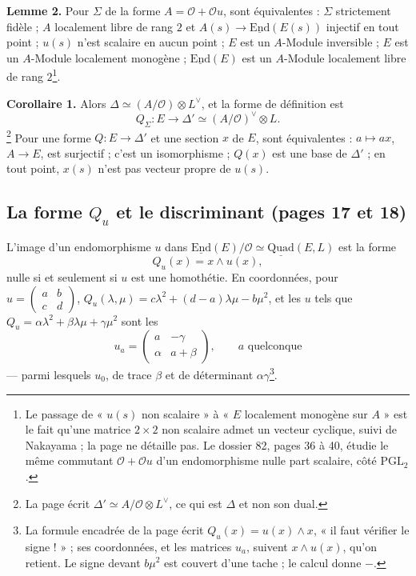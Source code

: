 \documentclass[11pt,a4paper]{article}
\begin{document}
\textbf{Lemme 2.} Pour $\Sigma$ de la forme $A = \mathcal{O} + \mathcal{O}u$, sont
équivalentes : $\Sigma$ strictement fidèle ; $A$ localement libre de rang $2$ et
$A(s) \to \underline{\mathrm{End}}(E(s))$ injectif en tout point ; $u(s)$ n'est
scalaire en aucun point ; $E$ est un $A$-Module inversible ; $E$ est un $A$-Module
localement monogène ; $\underline{\mathrm{End}}(E)$ est un $A$-Module localement
libre de rang $2$\footnote{Le passage de « $u(s)$ non scalaire » à « $E$ localement
monogène sur $A$ » est le fait qu'une matrice $2 \times 2$ non scalaire admet un
vecteur cyclique, suivi de Nakayama ; la page ne détaille pas. Le dossier 82,
pages 36 à 40, étudie le même commutant $\mathcal{O} + \mathcal{O}u$ d'un
endomorphisme nulle part scalaire, côté $\mathrm{PGL}_2$.}.

\textbf{Corollaire 1.} Alors $\Delta \simeq (A/\mathcal{O}) \otimes L^{\vee}$, et la forme
de définition est
\[
  Q_\Sigma : E \longrightarrow \Delta' \simeq (A/\mathcal{O})^{\vee} \otimes L.
\]\footnote{La
  page écrit $\Delta' \simeq A/\mathcal{O} \otimes L^{\vee}$, ce qui est $\Delta$ et non
  son dual.}
Pour une forme $Q : E \to \Delta'$ et une section $x$ de $E$, sont équivalentes :
$a \mapsto ax$, $A \to E$, est surjectif ; c'est un isomorphisme ; $Q(x)$ est une
base de $\Delta'$ ; en tout point, $x(s)$ n'est pas vecteur propre de $u(s)$.

\subsection*{La forme $Q_u$ et le discriminant (pages 17 et 18)}

L'image d'un endomorphisme $u$ dans $\underline{\mathrm{End}}(E)/\mathcal{O} \simeq
\underline{\mathrm{Quad}}(E, L)$ est la forme
\[
  Q_u(x) = x \wedge u(x),
\]
nulle si et seulement si $u$ est une homothétie. En coordonnées, pour
$u = \begin{pmatrix} a & b \\ c & d \end{pmatrix}$,
$Q_u(\lambda, \mu) = c\lambda^{2} + (d - a)\lambda\mu - b\mu^{2}$, et les $u$ tels que
$Q_u = \alpha\lambda^{2} + \beta\lambda\mu + \gamma\mu^{2}$ sont les
\[
  u_a = \begin{pmatrix} a & -\gamma \\ \alpha & a + \beta \end{pmatrix}, \qquad a \text{ quelconque}
\]
--- parmi lesquels $u_0$, de trace $\beta$ et de déterminant $\alpha\gamma$\footnote{La
formule encadrée de la page écrit $Q_u(x) = u(x) \wedge x$, « il faut vérifier le
signe ! » ; ses coordonnées, et les matrices $u_a$, suivent $x \wedge u(x)$, qu'on
retient. Le signe devant $b\mu^{2}$ est couvert d'une tache ; le calcul donne $-$.}.
\end{document}
